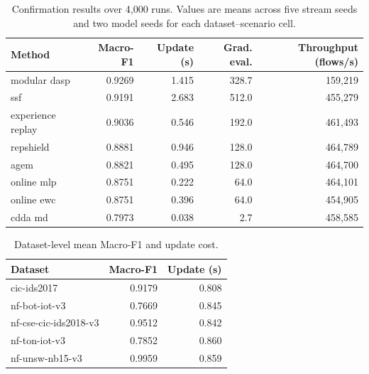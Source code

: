 \begin{table}[t]
\caption{Confirmation results over 4,000 runs. Values are means across five stream seeds and two model seeds for each dataset--scenario cell.}
\label{tab:overall}
\centering
\begin{tabular}{lrrrr}
\toprule
Method & Macro-F1 & Update (s) & Grad. eval. & Throughput (flows/s)\\
\midrule
modular dasp & 0.9269 & 1.415 & 328.7 & 159,219\\
ssf & 0.9191 & 2.683 & 512.0 & 455,279\\
experience replay & 0.9036 & 0.546 & 192.0 & 461,493\\
repshield & 0.8881 & 0.946 & 128.0 & 464,789\\
agem & 0.8821 & 0.495 & 128.0 & 464,700\\
online mlp & 0.8751 & 0.222 & 64.0 & 464,101\\
online ewc & 0.8751 & 0.396 & 64.0 & 454,905\\
cdda md & 0.7973 & 0.038 & 2.7 & 458,585\\
\bottomrule
\end{tabular}
\end{table}

\begin{table}[t]
\caption{Dataset-level mean Macro-F1 and update cost.}
\label{tab:dataset}
\centering
\begin{tabular}{lrr}
\toprule
Dataset & Macro-F1 & Update (s)\\
\midrule
cic-ids2017 & 0.9179 & 0.808\\
nf-bot-iot-v3 & 0.7669 & 0.845\\
nf-cse-cic-ids2018-v3 & 0.9512 & 0.842\\
nf-ton-iot-v3 & 0.7852 & 0.860\\
nf-unsw-nb15-v3 & 0.9959 & 0.859\\
\bottomrule
\end{tabular}
\end{table}
